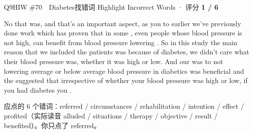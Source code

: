 \begin{qblock}{Q9\quad HIW \#70\ \ Diabetes}{找错词 Highlight Incorrect Words · 评分 \textcolor{cAccent}{\bfseries 1 / 6}}
\begin{promptbox}
No that was, and that's an important aspect, as you  to earlier we've previously done work which has proven that in some , even people whose blood pressure is not high, can benefit from blood pressure lowering . So in this study the main reason that we included the patients was because of diabetes, we didn't care what their blood pressure was, whether it was high or low. And our  was to not lowering average or below average blood pressure in diabetics was beneficial and the  suggested that irrespective of whether your blood pressure was high or low, if you had diabetes you .
\end{promptbox}
\par{\small 应点的 6 个错词：{\color{cWrong}referred / circumstances / rehabilitation / intention / effect / profited}\quad（实际读音 alluded / situations / therapy / objective / result / benefited）。\;你只点了 {\color{cWrong}referred}。}
\end{qblock}

